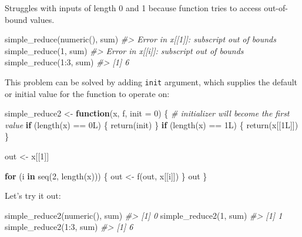 \documentclass[
]{book}
\newenvironment{Shaded}{\begin{snugshade}}{\end{snugshade}}
\newcommand{\AttributeTok}[1]{\textcolor[rgb]{0.77,0.63,0.00}{#1}}
\newcommand{\CommentTok}[1]{\textcolor[rgb]{0.56,0.35,0.01}{\textit{#1}}}
\newcommand{\ControlFlowTok}[1]{\textcolor[rgb]{0.13,0.29,0.53}{\textbf{#1}}}
\newcommand{\DecValTok}[1]{\textcolor[rgb]{0.00,0.00,0.81}{#1}}
\newcommand{\FunctionTok}[1]{\textcolor[rgb]{0.00,0.00,0.00}{#1}}
\newcommand{\NormalTok}[1]{#1}
\newcommand{\OtherTok}[1]{\textcolor[rgb]{0.56,0.35,0.01}{#1}}
\newcommand{\SpecialCharTok}[1]{\textcolor[rgb]{0.00,0.00,0.00}{#1}}
\begin{document}
Struggles with inputs of length 0 and 1 because function tries to access out-of-bound values.

\begin{Shaded}
\begin{Highlighting}[]
\FunctionTok{simple\_reduce}\NormalTok{(}\FunctionTok{numeric}\NormalTok{(), sum)}
\CommentTok{\#\textgreater{} Error in x[[1]]: subscript out of bounds}
\FunctionTok{simple\_reduce}\NormalTok{(}\DecValTok{1}\NormalTok{, sum)}
\CommentTok{\#\textgreater{} Error in x[[i]]: subscript out of bounds}
\FunctionTok{simple\_reduce}\NormalTok{(}\DecValTok{1}\SpecialCharTok{:}\DecValTok{3}\NormalTok{, sum)}
\CommentTok{\#\textgreater{} [1] 6}
\end{Highlighting}
\end{Shaded}

This problem can be solved by adding \texttt{init} argument, which supplies the default or initial value for the function to operate on:

\begin{Shaded}
\begin{Highlighting}[]
\NormalTok{simple\_reduce2 }\OtherTok{\textless{}{-}} \ControlFlowTok{function}\NormalTok{(x, f, }\AttributeTok{init =} \DecValTok{0}\NormalTok{) \{}
  \CommentTok{\# initializer will become the first value}
  \ControlFlowTok{if}\NormalTok{ (}\FunctionTok{length}\NormalTok{(x) }\SpecialCharTok{==}\NormalTok{ 0L) \{}
    \FunctionTok{return}\NormalTok{(init)}
\NormalTok{  \}}
  \ControlFlowTok{if}\NormalTok{ (}\FunctionTok{length}\NormalTok{(x) }\SpecialCharTok{==}\NormalTok{ 1L) \{}
    \FunctionTok{return}\NormalTok{(x[[1L]])}
\NormalTok{  \}}

\NormalTok{  out }\OtherTok{\textless{}{-}}\NormalTok{ x[[}\DecValTok{1}\NormalTok{]]}

  \ControlFlowTok{for}\NormalTok{ (i }\ControlFlowTok{in} \FunctionTok{seq}\NormalTok{(}\DecValTok{2}\NormalTok{, }\FunctionTok{length}\NormalTok{(x))) \{}
\NormalTok{    out }\OtherTok{\textless{}{-}} \FunctionTok{f}\NormalTok{(out, x[[i]])}
\NormalTok{  \}}
\NormalTok{  out}
\NormalTok{\}}
\end{Highlighting}
\end{Shaded}

Let's try it out:

\begin{Shaded}
\begin{Highlighting}[]
\FunctionTok{simple\_reduce2}\NormalTok{(}\FunctionTok{numeric}\NormalTok{(), sum)}
\CommentTok{\#\textgreater{} [1] 0}
\FunctionTok{simple\_reduce2}\NormalTok{(}\DecValTok{1}\NormalTok{, sum)}
\CommentTok{\#\textgreater{} [1] 1}
\FunctionTok{simple\_reduce2}\NormalTok{(}\DecValTok{1}\SpecialCharTok{:}\DecValTok{3}\NormalTok{, sum)}
\CommentTok{\#\textgreater{} [1] 6}
\end{Highlighting}
\end{Shaded}
\end{document}
